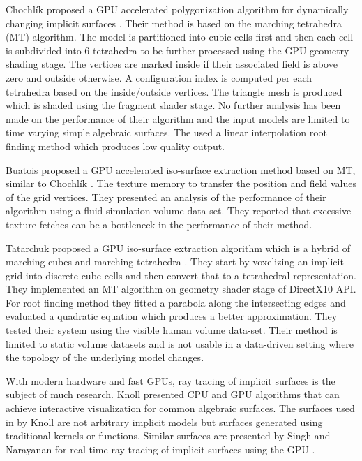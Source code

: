 Chochl{\'i}k \etal proposed a GPU accelerated polygonization algorithm for dynamically changing implicit surfaces \cite{chochlik2012gpu}. 
Their method is based on the marching tetrahedra (MT) algorithm. The model is partitioned into cubic cells first and then each cell is 
subdivided into 6 tetrahedra to be further processed using the GPU geometry shading stage. The vertices are marked inside if their 
associated field is above zero and outside otherwise. A configuration index is computed per each tetrahedra based on the inside/outside 
vertices. The triangle mesh is produced which is shaded using the fragment shader stage. No further analysis has been made on the performance 
of their algorithm and the input models are limited to time varying simple algebraic surfaces. The used a linear interpolation root finding
method which produces low quality output. 

Buatois \etal proposed a GPU accelerated iso-surface extraction method based on MT, similar to Chochl{\'i}k \etal \cite{Buatois2006}. The 
texture memory to transfer the position and field values of the grid vertices. They presented an analysis of the performance of their algorithm
using a fluid simulation volume data-set. They reported that excessive texture fetches can be a bottleneck in the performance of their method.


Tatarchuk \etal proposed a GPU iso-surface extraction algorithm which is a hybrid of marching cubes and marching tetrahedra \cite{Tatarchuk2007}. 
They start by voxelizing an implicit grid into discrete cube cells and then convert that to a tetrahedral representation. They implemented an MT 
algorithm on geometry shader stage of DirectX10 API. For root finding method they fitted a parabola along the intersecting edges and evaluated a 
quadratic equation which produces a better approximation. They tested their system using the visible human volume data-set. Their method
is limited to static volume datasets and is not usable in a data-driven setting where the topology of the underlying model changes. 

With modern hardware and fast GPUs, ray tracing of implicit surfaces is the subject of much research. Knoll \etal \cite{Knoll2009} presented 
CPU and GPU algorithms that can achieve interactive visualization for common algebraic surfaces. The surfaces used in by Knoll \etal are not 
arbitrary implicit models but surfaces generated using traditional kernels or functions. Similar surfaces are presented by Singh and Narayanan
for real-time ray tracing of implicit surfaces using the GPU \cite{singh2010real}. 


